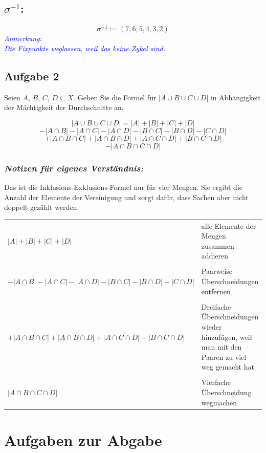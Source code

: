 \documentclass{article} %
\begin{document}
 \subsection*{$\sigma^{-1}$:}   
    \[
    \sigma^{-1} := (7,6,5,4,3,2)
    \]
\textcolor{Blue}{\textit{Anmerkung: \\ Die Fixpunkte weglassen, weil das keine Zykel sind.}}
\subsection{Aufgabe 2}
     Seien $A$, $B$, $C$, $D \subseteq X$. Geben Sie die Formel für $|A \cup B \cup C \cup D|$ in Abhängigkeit der Mächtigkeit der Durchschnitte an.

\[
|A \cup B \cup C \cup D| = |A| + |B| + |C| + |D| 
\]
\[
- |A \cap B| - |A \cap C| - |A \cap D| - |B \cap C| - |B \cap D| - |C \cap D|
\]
\[
+ |A \cap B \cap C| + |A \cap B \cap D| + |A \cap C \cap D| + |B \cap C \cap D|
\]
\[
- |A \cap B \cap C \cap D|
\]
\color{Blue}
\subsubsection*{\textit{Notizen für eigenes Verständnis:}}
Das ist die Inklusions-Exklusions-Formel nur für vier Mengen. Sie ergibt die Anzahl der Elemente der Vereinigung und sorgt dafür, dass Sachen aber nicht doppelt gezählt werden. 
\begin{table}[h]
\color{Blue}
    \centering
    \begin{tabular}{p{8cm} p{9cm}}
        $|A| + |B| + |C| + |D| $ & alle Elemente der Mengen zusammen addieren \\ \\
        $- |A \cap B| - |A \cap C| - |A \cap D| - |B \cap C| - |B \cap D| - |C \cap D|$ &  Paarweise Überschneidungen entfernen \\ \\
        $+ |A \cap B \cap C| + |A \cap B \cap D| + |A \cap C \cap D| + |B \cap C \cap D|$ & Dreifache Überschneidungen wieder hinzufügen, weil man mit den Paaren zu viel weg gemacht hat \\ \\
        $|A \cap B \cap C \cap D|$ & Vierfache Überschneidung wegmachen \\
    \end{tabular}
\end{table}
\color{black}
\section{Aufgaben zur Abgabe}
\end{document}
